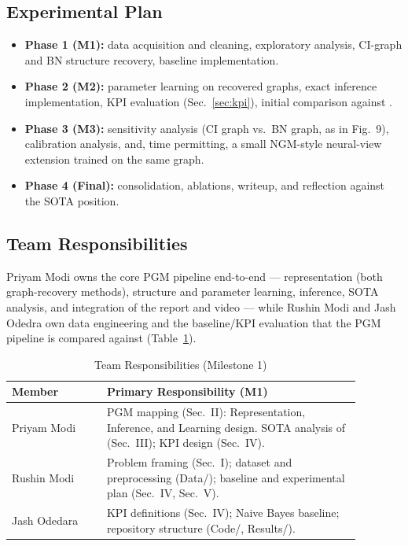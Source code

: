 \documentclass[conference]{IEEEtran}
\begin{document}
	\subsection{Experimental Plan}
	\begin{itemize}
		\item \textbf{Phase 1 (M1):} data acquisition and cleaning, exploratory analysis, CI-graph and BN structure recovery, baseline implementation.
		\item \textbf{Phase 2 (M2):} parameter learning on recovered graphs, exact inference implementation, KPI evaluation (Sec.~\ref{sec:kpi}), initial comparison against \cite{ngm2022}.
		\item \textbf{Phase 3 (M3):} sensitivity analysis (CI graph vs.\ BN graph, as in \cite{ngm2022} Fig.~9), calibration analysis, and, time permitting, a small NGM-style neural-view extension trained on the same graph.
		\item \textbf{Phase 4 (Final):} consolidation, ablations, writeup, and reflection against the SOTA position.
	\end{itemize}
	
	\subsection{Team Responsibilities}
	Priyam Modi owns the core PGM pipeline end-to-end --- representation (both graph-recovery methods), structure and parameter learning, inference, SOTA analysis, and integration of the report and video --- while Rushin Modi and Jash Odedra own data engineering and the baseline/KPI evaluation that the PGM pipeline is compared against (Table~\ref{tab:team}).
\begin{table}[htbp]
	\caption{Team Responsibilities (Milestone 1)}
	\label{tab:team}
	\centering
	\begin{tabular}{>{\raggedright\arraybackslash}p{0.24\linewidth}
			>{\raggedright\arraybackslash}p{0.64\linewidth}}
		\toprule
		\textbf{Member} & \textbf{Primary Responsibility (M1)} \\
		\midrule
		Priyam Modi & PGM mapping (Sec.~II): Representation, Inference, and Learning design. SOTA analysis of \cite{ngm2022} (Sec.~III); KPI design (Sec.~IV). \\
		
		\midrule
		Rushin Modi & Problem framing (Sec.~I); dataset and preprocessing (Data/); baseline and experimental plan (Sec.~IV, Sec.~V). \\
		\midrule
		Jash Odedara & KPI definitions (Sec.~IV); Naive Bayes baseline; repository structure (Code/, Results/). \\
		\bottomrule
	\end{tabular}
\end{table}
	
\end{document}
